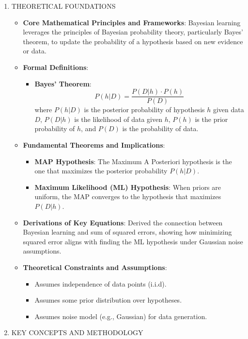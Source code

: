 \documentclass[
  12pt,
]{report}
\providecommand{\tightlist}{%
  \setlength{\itemsep}{0pt}\setlength{\parskip}{0pt}}
\begin{document}
\begin{enumerate}
\def\labelenumi{\arabic{enumi}.}
\item
  THEORETICAL FOUNDATIONS

  \begin{itemize}
  \tightlist
  \item
    \textbf{Core Mathematical Principles and Frameworks}: Bayesian learning leverages the principles of Bayesian probability theory, particularly Bayes' theorem, to update the probability of a hypothesis based on new evidence or data.
  \item
    \textbf{Formal Definitions}:

    \begin{itemize}
    \tightlist
    \item
      \textbf{Bayes' Theorem}:
      \[ P(h|D) = \frac{P(D|h) \cdot P(h)}{P(D)} \]
      where \(P(h|D)\) is the posterior probability of hypothesis \(h\) given data \(D\), \(P(D|h)\) is the likelihood of data given \(h\), \(P(h)\) is the prior probability of \(h\), and \(P(D)\) is the probability of data.
    \end{itemize}
  \item
    \textbf{Fundamental Theorems and Implications}:

    \begin{itemize}
    \tightlist
    \item
      \textbf{MAP Hypothesis}: The Maximum A Posteriori hypothesis is the one that maximizes the posterior probability \(P(h|D)\).
    \item
      \textbf{Maximum Likelihood (ML) Hypothesis}: When priors are uniform, the MAP converges to the hypothesis that maximizes \(P(D|h)\).
    \end{itemize}
  \item
    \textbf{Derivations of Key Equations}: Derived the connection between Bayesian learning and sum of squared errors, showing how minimizing squared error aligns with finding the ML hypothesis under Gaussian noise assumptions.
  \item
    \textbf{Theoretical Constraints and Assumptions}:

    \begin{itemize}
    \tightlist
    \item
      Assumes independence of data points (i.i.d).
    \item
      Assumes some prior distribution over hypotheses.
    \item
      Assumes noise model (e.g., Gaussian) for data generation.
    \end{itemize}
  \end{itemize}
\item
  KEY CONCEPTS AND METHODOLOGY


\end{enumerate}
\end{document}
